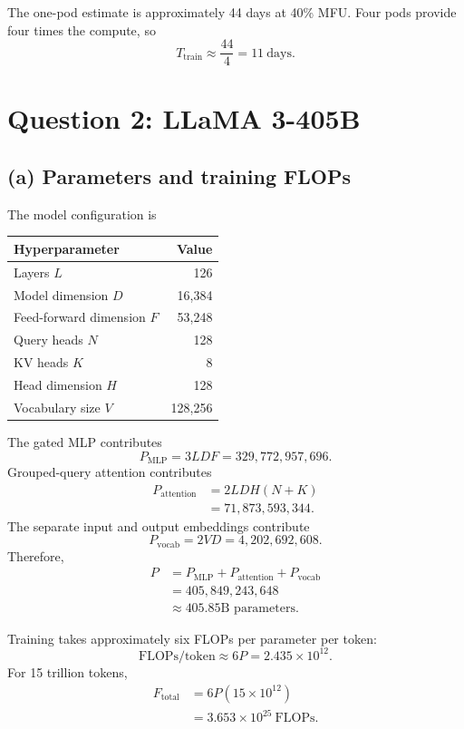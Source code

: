\documentclass[11pt]{article}
\begin{document}
The one-pod estimate is approximately 44 days at 40\% MFU. Four pods provide
four times the compute, so
\[
\boxed{T_{\mathrm{train}}\approx\frac{44}{4}=11\ \text{days}}.
\]

\section*{Question 2: LLaMA 3-405B}

\subsection*{(a) Parameters and training FLOPs}

The model configuration is
\begin{center}
\begin{tabular}{@{}lr@{}}
\toprule
Hyperparameter & Value \\
\midrule
Layers $L$ & 126 \\
Model dimension $D$ & 16,384 \\
Feed-forward dimension $F$ & 53,248 \\
Query heads $N$ & 128 \\
KV heads $K$ & 8 \\
Head dimension $H$ & 128 \\
Vocabulary size $V$ & 128,256 \\
\bottomrule
\end{tabular}
\end{center}

The gated MLP contributes
\[
P_{\mathrm{MLP}}=3LDF
=329{,}772{,}957{,}696.
\]
Grouped-query attention contributes
\begin{align*}
P_{\mathrm{attention}}
&=2LDH(N+K)\\
&=71{,}873{,}593{,}344.
\end{align*}
The separate input and output embeddings contribute
\[
P_{\mathrm{vocab}}=2VD
=4{,}202{,}692{,}608.
\]
Therefore,
\begin{align*}
P
&=P_{\mathrm{MLP}}+P_{\mathrm{attention}}+P_{\mathrm{vocab}}\\
&=405{,}849{,}243{,}648\\
&\approx\boxed{405.85\text{B parameters}}.
\end{align*}

Training takes approximately six FLOPs per parameter per token:
\[
\boxed{\text{FLOPs/token}\approx6P
=2.435\times10^{12}}.
\]
For 15 trillion tokens,
\begin{align*}
F_{\mathrm{total}}
&=6P(15\times10^{12})\\
&=3.653\times10^{25}\ \text{FLOPs}.
\end{align*}
\end{document}
